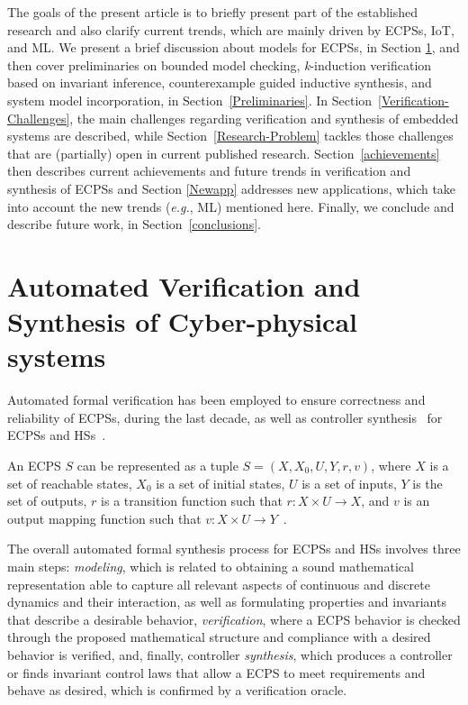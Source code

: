 \documentclass[format=acmsmall, review=false, screen=true]{acmart}
\begin{document}
The goals of the present article is to briefly present part of the established research and also clarify current trends, which are mainly driven by ECPSs, IoT, and ML. We present a brief discussion about models for ECPSs, in Section \ref{sec:model}, and then cover preliminaries on bounded model checking, \textit{k}-induction verification based on invariant inference, counterexample guided inductive synthesis, and system model incorporation, in Section~\ref{Preliminaries}. In Section~\ref{Verification-Challenges}, the main challenges regarding verification and synthesis of embedded systems are described, while Section~\ref{Research-Problem} tackles those challenges that are (partially) open in current published research. Section~\ref{achievements} then describes current achievements and future trends in verification and synthesis of ECPSs and Section \ref{Newapp} addresses new applications, which take into account the new trends ({\it e.g.}, ML) mentioned here. Finally, we conclude and describe future work, in Section~\ref{conclusions}.

\section{Automated Verification and Synthesis of Cyber-physical systems}
\label{sec:model}

Automated formal verification has been employed to ensure correctness and reliability of ECPSs, during the last decade, as well as controller synthesis~\cite{Nilsson16,Prabhakar17,EsmaeilZadehSoudjani17,Ames17,tabuada2009verification,Hasuo17,Zamani15} for ECPSs and HSs~\cite{Clarke11,Aerts17,Zhang14,Simko14,Sanwal13,Lee13,Li14}. 

An ECPS $S$ can be represented as a tuple $S=(X,X_{0},U,Y,r,v)$, where $X$ is a set of reachable states, $X_{0}$ is a set of initial states, $U$ is a set of inputs, $Y$ is the set of outputs, $r$ is a transition function such that $r:X\times U \rightarrow X$, and  $v$ is an output mapping function such that $v:X\times U \rightarrow Y$~\cite{Rungger16,Alur00,Girard11}.

The overall automated formal synthesis process for ECPSs and HSs involves three main steps: \textit{modeling}, which is related to obtaining a sound mathematical representation able to capture all relevant aspects of continuous and discrete dynamics and their interaction, as well as formulating properties and invariants that describe a desirable behavior, \textit{verification}, where a ECPS behavior is checked through the proposed mathematical structure and compliance with a desired behavior is verified, and, finally, controller \textit{synthesis}, which produces a controller or finds invariant control laws that allow a ECPS to meet requirements and behave as desired, which is confirmed by a verification oracle. 
\end{document}
